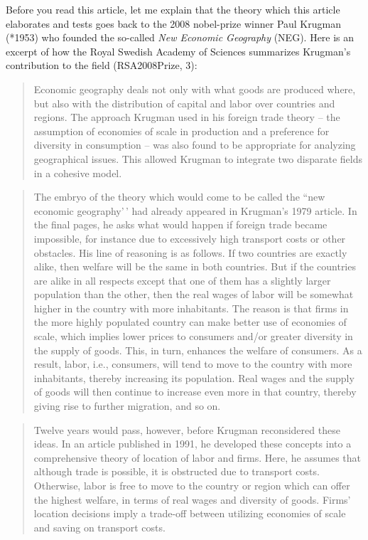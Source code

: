\documentclass[
  12pt,
  oneside]{book}
\theoremstyle{definition}
\theoremstyle{definition}
\theoremstyle{definition}
\theoremstyle{definition}
\theoremstyle{remark}
\begin{document}
Before you read this article, let me explain that the theory which this article elaborates and tests goes back to the 2008 nobel-prize winner Paul Krugman (*1953) who founded the so-called \emph{New Economic Geography} (NEG).
Here is an excerpt of how the Royal Swedish Academy of Sciences summarizes Krugman's contribution to the field (RSA2008Prize, 3):

\begin{quote}
Economic geography deals not only with what goods are produced where, but also with the distribution of capital and labor over countries and regions. The approach Krugman used in his foreign trade theory -- the assumption of economies of scale in production and a preference for diversity in consumption -- was also found to be appropriate for analyzing geographical issues. This allowed Krugman to integrate two disparate fields in a cohesive model.
\end{quote}

\begin{quote}
The embryo of the theory which would come to be called the ``new economic geography'\,' had already appeared in Krugman's 1979 article. In the final pages, he asks what would happen if foreign trade became impossible, for instance due to excessively high transport costs or other obstacles. His line of reasoning is as follows. If two countries are exactly alike, then welfare will be the same in both countries. But if the countries are alike in all respects except that one of them has a slightly larger population than the other, then the real wages of labor will be somewhat higher in the country with more inhabitants. The reason is that firms in the more highly populated country can make better use of economies of scale, which implies lower prices to consumers and/or greater diversity in the supply of goods. This, in turn, enhances the welfare of consumers. As a result, labor, i.e., consumers, will tend to move to the country with more inhabitants, thereby increasing its population. Real wages and the supply of goods will then continue to increase even more in that country, thereby giving rise to further migration, and so on.
\end{quote}

\begin{quote}
Twelve years would pass, however, before Krugman reconsidered these ideas. In an article published in 1991, he developed these concepts into a comprehensive theory of location of labor and firms. Here, he assumes that although trade is possible, it is obstructed due to transport costs. Otherwise, labor is free to move to the country or region which can offer the highest welfare, in terms of real wages and diversity of goods. Firms' location decisions imply a trade-off between utilizing economies of scale and saving on transport costs.
\end{quote}
\end{document}
